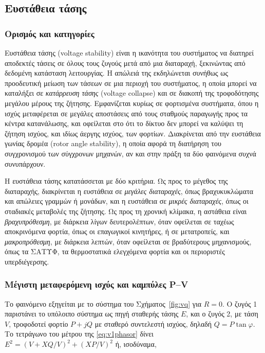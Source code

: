 \subsection{Ευστάθεια τάσης}
\label{sec:v-stability}

\subsubsection{Ορισμός και κατηγορίες}

Ευστάθεια τάσης (voltage stability) είναι η ικανότητα του συστήματος να διατηρεί αποδεκτές
τάσεις σε όλους τους ζυγούς μετά από μια διαταραχή, ξεκινώντας από δεδομένη κατάσταση
λειτουργίας. Η απώλειά της εκδηλώνεται συνήθως ως προοδευτική μείωση των τάσεων σε μια περιοχή
του συστήματος, η οποία μπορεί να καταλήξει σε \emph{κατάρρευση τάσης} (voltage collapse) και
σε διακοπή της τροφοδότησης μεγάλου μέρους της ζήτησης. Εμφανίζεται κυρίως σε φορτισμένα
συστήματα, όπου η ισχύς μεταφέρεται σε μεγάλες αποστάσεις από τους σταθμούς παραγωγής προς τα
κέντρα κατανάλωσης, και οφείλεται στο ότι το δίκτυο δεν μπορεί να καλύψει τη ζήτηση ισχύος, και
ιδίως άεργης ισχύος, των φορτίων. Διακρίνεται από την ευστάθεια γωνίας δρομέα (rotor angle
stability), η οποία αφορά τη
διατήρηση του συγχρονισμού των σύγχρονων μηχανών, αν και στην πράξη τα δύο φαινόμενα συχνά
συνυπάρχουν.

Η ευστάθεια τάσης κατατάσσεται με δύο κριτήρια. Ως προς το μέγεθος της διαταραχής, διακρίνεται
η ευστάθεια σε \emph{μεγάλες διαταραχές}, όπως βραχυκυκλώματα και απώλειες γραμμών ή μονάδων,
και η ευστάθεια σε \emph{μικρές διαταραχές}, όπως οι σταδιακές μεταβολές της ζήτησης. Ως προς
τη χρονική κλίμακα, η αστάθεια είναι \emph{βραχυπρόθεσμη}, με διάρκεια λίγων δευτερολέπτων,
όταν οφείλεται σε ταχέως αποκρινόμενα φορτία, όπως οι επαγωγικοί κινητήρες, ή σε μετατροπείς,
και \emph{μακροπρόθεσμη}, με διάρκεια λεπτών, όταν οφείλεται σε βραδύτερους μηχανισμούς, όπως
τα ΣΑΤΥΦ, τα θερμοστατικά ελεγχόμενα φορτία και οι περιοριστές υπερδιέγερσης.

\subsubsection{Μέγιστη μεταφερόμενη ισχύς και καμπύλες P--V}

Το φαινόμενο εξηγείται με το σύστημα του Σχήματος~\ref{fig:vq} για $R = 0$. Ο ζυγός 1
παριστάνει το υπόλοιπο σύστημα ως πηγή σταθερής τάσης $E$, και ο ζυγός 2, με τάση $V$,
τροφοδοτεί φορτίο $P + jQ$ με σταθερό συντελεστή ισχύος, δηλαδή $Q = P\tan\varphi$. Το
τετράγωνο του μέτρου της \eqref{eq:v1phasor} δίνει $E^2 = (V + XQ/V)^2 + (XP/V)^2$ ή,
ισοδύναμα,

